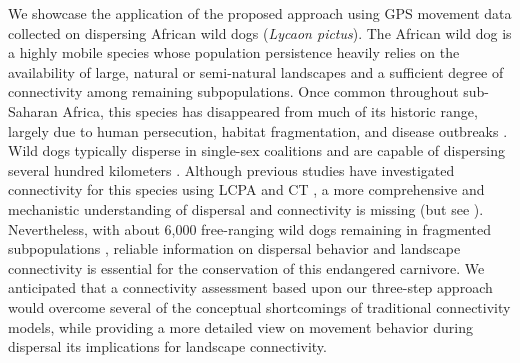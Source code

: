 \documentclass[abstract=on,10pt,a4paper,bibliography=totocnumbered]{article}
\begin{document}
We showcase the application of the proposed approach using GPS movement data
collected on dispersing African wild dogs (\textit{Lycaon pictus}). The African
wild dog is a highly mobile species whose population persistence heavily relies
on the availability of large, natural or semi-natural landscapes and a
sufficient degree of connectivity among remaining subpopulations. Once common
throughout sub-Saharan Africa, this species has disappeared from much of its
historic range, largely due to human persecution, habitat fragmentation, and
disease outbreaks \citep{Woodroffe.2012}. Wild dogs typically disperse in
single-sex coalitions \citep{McNutt.1996, Behr.2020} and are capable of
dispersing several hundred kilometers \citep{DaviesMostert.2012, Masenga.2016,
Cozzi.2020}. Although previous studies have investigated connectivity for this
species using LCPA \citep{Hofmann.2021} and CT \citep{Brennan.2020}, a more
comprehensive and mechanistic understanding of dispersal and connectivity is
missing (but see \citealp{Creel.2020}). Nevertheless, with about 6,000
free-ranging wild dogs remaining in fragmented subpopulations
\citep{Woodroffe.2012}, reliable information on dispersal behavior and landscape
connectivity is essential for the conservation of this endangered carnivore. We
anticipated that a connectivity assessment based upon our three-step approach
would overcome several of the conceptual shortcomings of traditional
connectivity models, while providing a more detailed view on movement behavior
during dispersal its implications for landscape connectivity.
\end{document}
